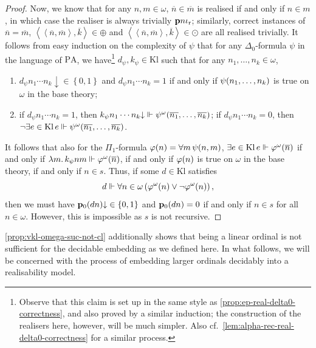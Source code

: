 \documentclass[12pt,openany]{book}
\theoremstyle{plain}
\theoremstyle{definition}
\newcommand\uplabel[1]{\textup{(#1)}}
\newcommand\tuple[1]{\left\langle #1 \right\rangle}
\newcommand\opA[1]{\mathop{\forall #1}}
\newcommand\opE[1]{\mathop{\exists #1}}
\newcommand\oplam[1]{\mathop{\lambda #1.}}
\newcommand\PA{\mathrm{PA}}
\newcommand\Kl{\mathrm{Kl}}
\newcommand\bp{\mathbf{p}}
\newcommand\ior{\iota_\textup{r}}
\begin{document}
\begin{proof}
  Now, we know that for any $n, m \in \omega$, $\overline{n} \in \overline{m}$ is realised if and only if $n \in m$, in which case the realiser is always trivially $\bp n \ior$; similarly, correct instances of $\overline{n} = \overline{m}$, $\tuple{\tuple{\overline{n}, \overline{m}}, \overline{k}} \in \oplus$ and $\tuple{\tuple{\overline{n}, \overline{m}}, \overline{k}} \in \odot$ are all realised trivially. It follows from easy induction on the complexity of $\psi$ that for any $\Delta_0$-formula $\psi$ in the language of $\PA$, we have\footnote{Observe that this claim is set up in the same style as \autoref{prop:ep-real-delta0-correctness}, and also proved by a similar induction; the construction of the realisers here, however, will be much simpler. Also cf.\ \autoref{lem:alpha-rec-real-delta0-correctness} for a similar process.} $d_\psi, k_\psi \in \Kl$ such that for any $n_1, \ldots, n_k \in \omega$,
  \begin{enumerate}[label=\uplabel{\roman*}]
    \item $d_\psi n_1 \cdots n_k {\downarrow} \in \left\{0, 1\right\}$ and $d_\psi n_1 \cdots n_k = 1$ if and only if $\psi\mleft(n_1, \ldots, n_k\mright)$ is true on $\omega$ in the base theory;
    \item if $d_\psi n_1 \cdots n_k = 1$, then $k_\psi n_1 \cdots n_k {\downarrow} \Vdash \psi^\omega\mleft(\overline{n_1}, \ldots, \overline{n_k}\mright)$; if $d_\psi n_1 \cdots n_k = 0$, then $\neg\!\opE{e \in \Kl} e \Vdash \psi^\omega\mleft(\overline{n_1}, \ldots, \overline{n_k}\mright)$.
  \end{enumerate}

  It follows that also for the $\Pi_1$-formula $\varphi\mleft(n\mright) = \opA{m} \psi\mleft(n, m\mright)$, $\opE{e \in \Kl} e \Vdash \varphi^\omega\mleft(\overline{n}\mright)$ if and only if $\oplam{m} k_\psi nm \Vdash \varphi^\omega\mleft(\overline{n}\mright)$, if and only if $\varphi\mleft(n\mright)$ is true on $\omega$ in the base theory, if and only if $n \in s$. Thus, if some $d \in \Kl$ satisfies
  \[d \Vdash \opA{n \in \omega} \left(\varphi^\omega\mleft(n\mright) \lor \neg \varphi^\omega\mleft(n\mright)\right),\]
  then we must have $\bp_0 \mleft(dn\mright) {\downarrow} \in \left\{0, 1\right\}$ and $\bp_0 \mleft(dn\mright) = 0$ if and only if $n \in s$ for all $n \in \omega$. However, this is impossible as $s$ is not recursive.
\end{proof}

\autoref{prop:vkl-omega-suc-not-cl} additionally shows that being a linear ordinal is not sufficient for the decidable embedding as we defined here. In what follows, we will be concerned with the process of embedding larger ordinals decidably into a realisability model.
\end{document}
